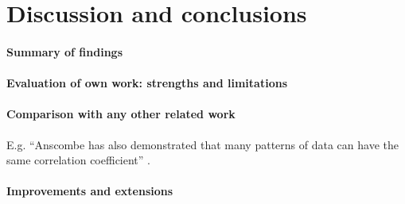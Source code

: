 \documentclass[11pt,a4paper]{article}
\begin{document}
\section{Discussion and conclusions}

\paragraph{Summary of findings}

\paragraph{Evaluation of own work: strengths and limitations}

\paragraph{Comparison with any other related work}
E.g. ``Anscombe has also demonstrated that many patterns of data can
have the same correlation coefficient'' \cite{Ansc73Grap}.

\paragraph{Improvements and extensions}



\end{document}
